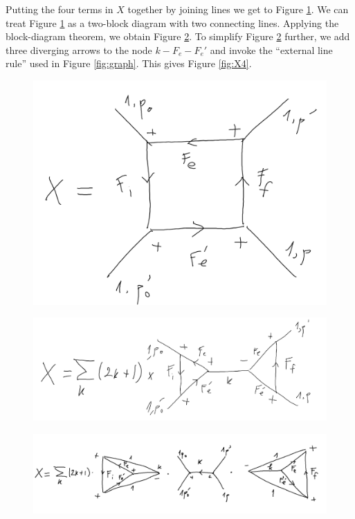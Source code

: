 \documentclass[11pt]{article}
\begin{document}
\begin{appendices}
Putting the four terms in $X$ together by joining lines we get to Figure \ref{fig:X2}. We can treat Figure \ref{fig:X2} as a two-block diagram with two connecting lines. Applying the block-diagram theorem, we obtain Figure \ref{fig:X3}. To simplify Figure \ref{fig:X3} further, we add three diverging arrows to the node $k-F_e-F_e'$ and invoke the ``external line rule'' used in Figure \ref{fig:graph}. This gives Figure \ref{fig:X4}.
\begin{figure}[!htb]
	\centering
	\includegraphics[scale=0.3]{draw_ang_2}
	\caption{}
	\label{fig:X2}
\end{figure}
\begin{figure}[!htb]
	\centering
	\includegraphics[scale=0.4]{draw_ang_3}
	\caption{}
	\label{fig:X3}
\end{figure}
\begin{figure}[!htb]
	\centering
	\includegraphics[scale=0.6]{draw_ang_4}

\end{figure}
\end{appendices}
\end{document}
